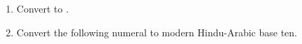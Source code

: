 
\begin{enumerate}
    \item Convert  to .

    \vspace{20pt}
    \begin{ansenv}
    \end{ansenv}
    \vfill

    \item Convert the following  numeral to modern Hindu-Arabic base ten.
    \begin{center}
    \end{center}

    \vspace{20pt}
    \begin{ansenv}
    \end{ansenv}
    \vfill
\end{enumerate}
